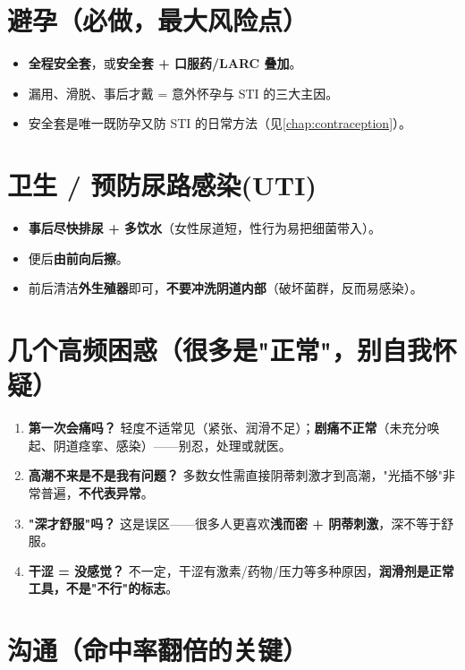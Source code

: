 \section{避孕（必做，最大风险点）}

\begin{itemize}[leftmargin=2em,itemsep=0.3em]
  \item \textbf{全程安全套}，或\textbf{安全套 + 口服药/LARC 叠加}。
  \item 漏用、滑脱、事后才戴 = 意外怀孕与 STI 的三大主因。
  \item 安全套是唯一既防孕又防 STI 的日常方法（见\ref{chap:contraception}）。
\end{itemize}

\section{卫生 / 预防尿路感染(UTI)}

\begin{itemize}[leftmargin=2em,itemsep=0.3em]
  \item \textbf{事后尽快排尿 + 多饮水}（女性尿道短，性行为易把细菌带入）。
  \item 便后\textbf{由前向后擦}。
  \item 前后清洁\textbf{外生殖器}即可，\textbf{不要冲洗阴道内部}（破坏菌群，反而易感染）。
\end{itemize}

\section{几个高频困惑（很多是"正常"，别自我怀疑）}

\begin{enumerate}[leftmargin=2em,itemsep=0.3em]
  \item \textbf{第一次会痛吗？} 轻度不适常见（紧张、润滑不足）；\textbf{剧痛不正常}（未充分唤起、阴道痉挛、感染）——别忍，处理或就医。
  \item \textbf{高潮不来是不是我有问题？} 多数女性需直接阴蒂刺激才到高潮，"光插不够"非常普遍，\textbf{不代表异常}。
  \item \textbf{"深才舒服"吗？} 这是误区——很多人更喜欢\textbf{浅而密 + 阴蒂刺激}，深不等于舒服。
  \item \textbf{干涩 = 没感觉？} 不一定，干涩有激素/药物/压力等多种原因，\textbf{润滑剂是正常工具，不是"不行"的标志}。
\end{enumerate}

\section{沟通（命中率翻倍的关键）}

